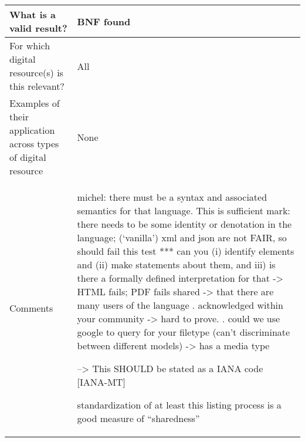 \documentclass[english]{article}
\begin{document}
\begin{longtable}{|p{5cm}|p{9cm}|}
\\



\hline
What is a valid result? &  


BNF found



\\



\hline
For which digital resource(s) is this relevant? &  All\\



\hline
Examples of their application across types of digital resource &  None

\\



\hline

Comments & 

michel: there must be a syntax and associated semantics for that language.  This is sufficient \newline 
mark: there needs to be some identity or denotation in the language; (‘vanilla’) xml and json are not FAIR, so should fail this test\newline 
\newline 
*** can you (i) identify elements and (ii) make statements about them, and iii) is there a formally defined interpretation for that 
 -> HTML fails; PDF fails
\newline 
shared\newline 
-> that there are many users of the language\newline 
. acknowledged within your community\newline 
 -> hard to prove.\newline 
. could we use google to query for your filetype (can’t discriminate between different models)\newline 
-> has a media type\newline 

--> This SHOULD be stated as a IANA code [IANA-MT]\newline 


standardization of at least this listing process is a good measure of “sharedness”\newline 


\end{longtable}
\end{document}
